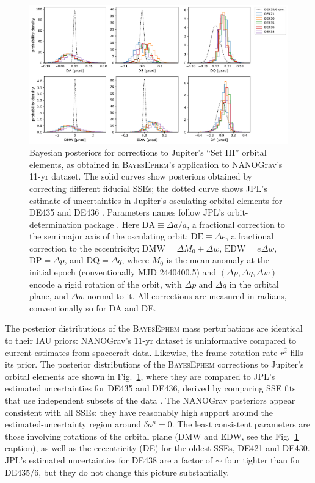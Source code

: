 \documentclass[iop,apj,twocolappendix]{emulateapj}
\begin{document}
%
\begin{figure}[t]
    \includegraphics[width=2\columnwidth]{figures/setIII-posteriors.pdf}
    \caption{Bayesian posteriors for corrections to Jupiter's ``Set III'' orbital elements, as obtained in \textsc{BayesEphem}'s application to NANOGrav's 11-yr dataset. The solid curves show posteriors obtained by correcting different fiducial SSEs; the dotted curve shows JPL's estimate of uncertainties in Jupiter's osculating orbital elements for DE435 and DE436 \citep{de434}.
    Parameters names follow JPL's orbit-determination package \citep{moyer2003}. %
    Here $\mathrm{DA} \equiv \Delta a/a$, a fractional correction to the semimajor axis of the osculating orbit; $\mathrm{DE} \equiv \Delta e$, a fractional correction to the eccentricity; $\mathrm{DMW} = \Delta M_0 + \Delta w$, $\mathrm{EDW} = e \Delta w$, $\mathrm{DP} = \Delta p$, and $\mathrm{DQ} = \Delta q$, where $M_0$ is the mean anomaly at the initial epoch (conventionally MJD 2440400.5) and $(\Delta p, \Delta q, \Delta w)$ encode a rigid rotation of the orbit, with $\Delta p$ and $\Delta q$ in the orbital plane, and $\Delta w$ normal to it. All corrections are measured in radians, conventionally so for DA and DE.}
    \label{fig:setIIIposteriors}
\end{figure}

The posterior distributions of the \textsc{BayesEphem} mass perturbations are identical to their IAU priors:  NANOGrav's 11-yr dataset is uninformative compared to current estimates from spacecraft data. Likewise, the frame rotation rate $r^{\hat{z}}$ fills its prior.
The posterior distributions of the \textsc{BayesEphem} corrections to Jupiter's orbital elements are shown in Fig.\ \ref{fig:setIIIposteriors}, where they are compared to JPL's estimated uncertainties for DE435 and DE436, derived by comparing SSE fits that use independent subsets of the data \citep{de434}. The NANOGrav posteriors appear consistent with all SSEs: they have reasonably high support around the estimated-uncertainty region around $\delta a^\mu = 0$. The least consistent parameters are those involving rotations of the orbital plane (DMW and EDW, see the Fig.\ \ref{fig:setIIIposteriors} caption), as well as the eccentricity (DE) for the oldest SSEs, DE421 and DE430. JPL's estimated uncertainties for DE438 are a factor of $\sim$ four tighter than for DE435/6, but they do not change this picture substantially.
\end{document}
